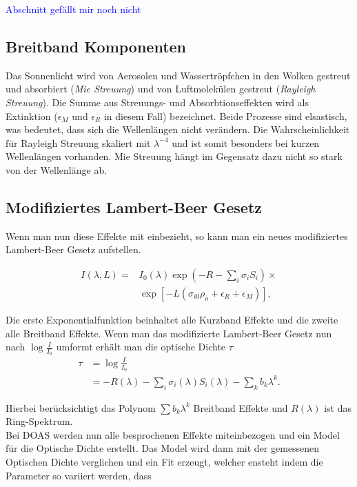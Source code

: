 \documentclass[12pt, a4paper, bibliography=totoc]{scrartcl}
\begin{document}
\begin{multicols}{2}
\textcolor{blue}{Abschnitt gefällt mir noch nicht}

\subsection{Breitband Komponenten}

Das Sonnenlicht wird von Aerosolen und Wassertröpfchen in den Wolken gestreut und absorbiert (\textit{Mie Streuung}) und von Luftmolekülen gestreut (\textit{Rayleigh Streuung}).
Die Summe aus Streuungs- und Absorbtionseffekten wird als Extinktion ($\epsilon_M$ und $\epsilon_R$ in diesem Fall) bezeichnet.
Beide Prozesse sind elsastisch, was bedeutet, dass sich die Wellenlängen nicht verändern.
Die Wahrscheinlichkeit für Rayleigh Streuung skaliert mit $\lambda^{-4}$ und ist somit besonders bei kurzen Wellenlängen vorhanden.
Mie Streuung hängt im Gegensatz dazu nicht so stark von der Wellenlänge ab.

\subsection{Modifiziertes Lambert-Beer Gesetz}\label{ssec:mod_lamb-beer_law}

Wenn man nun diese Effekte mit einbezieht, so kann man ein neues modifiziertes Lambert-Beer Gesetz aufstellen.

\begin{align*}
    I(\lambda, L) = & I_0 (\lambda) \exp \left( -R - \sum_i \sigma_i
    S_i \right) \times \\
    & \exp \left[ - L \left( \sigma_{i0} \rho_o + \epsilon_R + \epsilon_M \right) \right], \label{eq:mod_lambert_beer_law}
\end{align*}

Die erste Exponentialfunktion beinhaltet alle Kurzband Effekte und die zweite alle Breitband Effekte.
Wenn man das modifizierte Lambert-Beer Gesetz nun nach $\log \frac{I}{I_0}$ umformt erhält man die optische Dichte $\tau$
\begin{align}
\tau &= \log \frac{I}{I_0} \\
    &= - R(\lambda) - \sum_i \sigma_i (\lambda) S_i (\lambda) - \sum_k b_k \lambda^k.\label{eq:optical_density}
\end{align}

Hierbei berücksichtigt das Polynom $\sum b_k \lambda^k$ Breitband Effekte und $R(\lambda)$ ist das Ring-Spektrum.\\
Bei DOAS werden nun alle besprochenen Effekte miteinbezogen und ein Model für die Optische Dichte erstellt. 
Das Model wird dann mit der gemessenen Optischen Dichte verglichen und ein Fit erzeugt, welcher ensteht indem die Parameter so variiert werden, dass 


\end{multicols}
\end{document}
